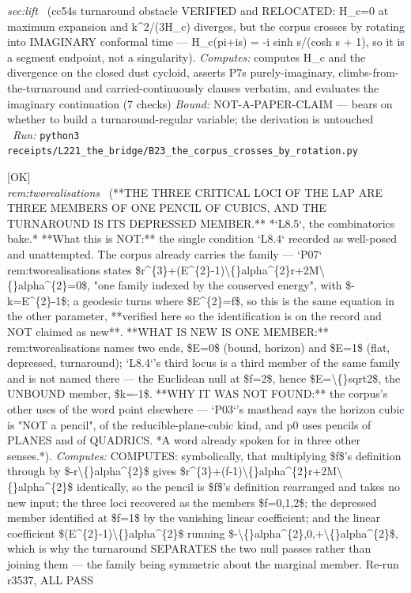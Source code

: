 \begin{description}
\textit{sec:lift} \ (cc54s turnaround obstacle VERIFIED and RELOCATED: H\_c=0 at maximum expansion and k\textasciicircum{}2/(3H\_c) diverges, but the corpus crosses by rotating into IMAGINARY conformal time --- H\_c(pi+is) = -i sinh s/(cosh s + 1), so it is a segment endpoint, not a singularity). 
\emph{Computes:} computes H\_c and the divergence on the closed dust cycloid, asserts P7s purely-imaginary, climbs-from-the-turnaround and carried-continuously clauses verbatim, and evaluates the imaginary continuation (7 checks)
 \emph{Bound:} NOT-A-PAPER-CLAIM --- bears on whether to build a turnaround-regular variable; the derivation is untouched
\ \emph{Run:} \texttt{python3 receipts/L221\_the\_bridge/B23\_the\_corpus\_crosses\_by\_rotation.py}
\item[\rcptlabel{L8_the_pencil}{P7R24}\textbf{P7R24}\quad\texttt{L8\_the\_pencil}]\hfill\textsf{[OK]}\\
\textit{rem:tworealisations} \ (**THE THREE CRITICAL LOCI OF THE LAP ARE THREE MEMBERS OF ONE PENCIL OF CUBICS, AND THE TURNAROUND IS ITS DEPRESSED MEMBER.** *`L8.5`, the combinatorics bake.* **What this is NOT:** the single condition `L8.4` recorded as well-posed and unattempted. The corpus already carries the family --- `P07` rem:tworealisations states \$r\textasciicircum{}\{3\}+(E\textasciicircum{}\{2\}-1)\textbackslash\{\}alpha\textasciicircum{}\{2\}r+2M\textbackslash\{\}alpha\textasciicircum{}\{2\}=0\$, "one family indexed by the conserved energy", with \$-k=E\textasciicircum{}\{2\}-1\$; a geodesic turns where \$E\textasciicircum{}\{2\}=f\$, so this is the same equation in the other parameter, **verified here so the identification is on the record and NOT claimed as new**. **WHAT IS NEW IS ONE MEMBER:** rem:tworealisations names two ends, \$E=0\$ (bound, horizon) and \$E=1\$ (flat, depressed, turnaround); `L8.4`'s third locus is a third member of the same family and is not named there --- the Euclidean null at \$f=2\$, hence \$E=\textbackslash\{\}sqrt2\$, the UNBOUND member, \$k=-1\$. **WHY IT WAS NOT FOUND:** the corpus's other uses of the word point elsewhere --- `P03`'s masthead says the horizon cubic is "NOT a pencil", of the reducible-plane-cubic kind, and p0 uses pencils of PLANES and of QUADRICS. *A word already spoken for in three other senses.*). 
\emph{Computes:} COMPUTES: symbolically, that multiplying \$f\$'s definition through by \$-r\textbackslash\{\}alpha\textasciicircum{}\{2\}\$ gives \$r\textasciicircum{}\{3\}+(f-1)\textbackslash\{\}alpha\textasciicircum{}\{2\}r+2M\textbackslash\{\}alpha\textasciicircum{}\{2\}\$ identically, so the pencil is \$f\$'s definition rearranged and takes no new input; the three loci recovered as the members \$f=0,1,2\$; the depressed member identified at \$f=1\$ by the vanishing linear coefficient; and the linear coefficient \$(E\textasciicircum{}\{2\}-1)\textbackslash\{\}alpha\textasciicircum{}\{2\}\$ running \$-\textbackslash\{\}alpha\textasciicircum{}\{2\},0,+\textbackslash\{\}alpha\textasciicircum{}\{2\}\$, which is why the turnaround SEPARATES the two null passes rather than joining them --- the family being symmetric about the marginal member. Re-run r3537, ALL PASS

\end{description}
